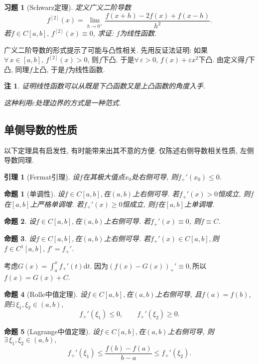 \documentclass[11pt,a4paper]{ctexart}
\makeatletter
\theoremstyle{thmseries} %
\newtheorem{prop}{命题}[section]
\newtheorem{lem}{引理}[section]
\theoremstyle{exerseries}
\newtheorem{exer}{习题}[section]
\newtheorem*{rem}{注}
\renewenvironment{proof}[1][\proofname]{\par
  \pushQED{\qed}%
  \normalfont \topsep6\p@\@plus6\p@\relax
  \trivlist
  \item[\hskip\labelsep
        \itshape
    #1\@addpunct{}]\ignorespaces
}{%
  \popQED\endtrivlist\@endpefalse
}
\newenvironment{pf}{\begin{proof}[\bfseries\upshape 证\quad]}{\end{proof}}
\newcommand{\bra}[1]{\mathopen{}\left(#1\right)}
\renewcommand{\epsilon}{\varepsilon}
\renewcommand{\d}{\mathrm{d}}
\makeatother
\begin{document}
\begin{exer}[Schwarz定理]
	定义广义二阶导数
	\[f^{[2]}(x)=\lim_{h\to0^+}\frac{f(x+h)-2f(x)+f(x-h)}{h^2}.\]
	若$f\in C[a,b],\,f^{[2]}(x)\equiv0$, 求证: $f$为线性函数. 
\end{exer}
\begin{pf}
	广义二阶导数的形式提示了可能与凸性相关. 先用反证法证明: 如果$\forall\,x\in[a,b],\,f^{[2]}(x)>0$, 则$f$下凸. 于是$\forall\,\epsilon>0,\,f(x)+\epsilon x^2$下凸. 由定义得$f$下凸, 同理$f$上凸, 于是$f$为线性函数. 
\end{pf}
\begin{rem}
	证明线性函数可以从既是下凸函数又是上凸函数的角度入手. 
	
	这种利用$\epsilon$处理边界的方式是一种范式. 
\end{rem}


\subsection{单侧导数的性质}
以下定理具有启发性, 有时能带来出其不意的方便. 仅陈述右侧导数相关性质, 左侧导数同理. 
\begin{lem}[Fermat引理]
	设$f$在其极大值点$x_0$处右侧可导, 则$f_+'(x_0)\leq0$. 
\end{lem}

\begin{prop}[单调性]
	设$f\in C[a,b],$在$(a,b)$上右侧可导. 若$f_+'(x)>0$恒成立, 则$f$在$[a,b]$上严格单调增. 若$f_+'(x)\geq0$恒成立, 则$f$在$[a,b]$上单调增. 
\end{prop}

\begin{prop}
	设$f\in C[a,b],$在$(a,b)$上右侧可导. 若$f_+'(x)\equiv0$, 则$f\equiv C$. 
\end{prop}

\begin{prop}
	设$f\in C[a,b],$在$(a,b)$上右侧可导. 若$f_+'(x)\in C[a,b],$则$f\in C^1[a,b],\,f'=f_+'$.
\end{prop}
\begin{pf}
	考虑$G(x)=\int_{a}^{x}f_+'(t)\d t$. 因为$\bra{f(x)-G(x)}_+'\equiv0,$所以$f(x)=G(x)+C$. 
\end{pf}

\begin{prop}[Rolle中值定理]
	设$f\in C[a,b],$在$(a,b)$上右侧可导, 且$f(a)=f(b)$, 则$\exists\,\xi_1,\xi_2\in(a,b),$
	\[f_+'(\xi_1)\leq0,\qquad f_+'(\xi_2)\geq0.\]
\end{prop}

\begin{prop}[Lagrange中值定理]
	设$f\in C[a,b],$在$(a,b)$上右侧可导, 则$\exists\,\xi_1,\xi_2\in(a,b),$
	\[f_+'(\xi_1)\leq\frac{f(b)-f(a)}{b-a}\leq f_+'(\xi_2).\]
\end{prop}
\end{document}
